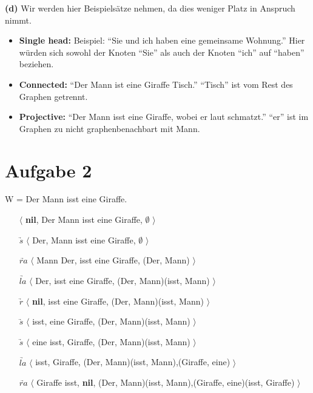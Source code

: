 \documentclass[a4paper,10pt]{article}
\begin{document}
\newpage
\noindent \textbf{(d)} Wir werden hier Beispielsätze nehmen, da dies weniger Platz in Anspruch nimmt.
\begin{itemize}
 \item \textbf{Single head:} Beispiel: ``Sie und ich haben eine gemeinsame Wohnung.'' Hier würden sich sowohl der Knoten ``Sie'' als auch der Knoten ``ich'' auf ``haben''
 beziehen.
 \item \textbf{Connected:} ``Der Mann ist eine Giraffe Tisch.'' ``Tisch'' ist vom Rest des Graphen getrennt.
 \item \textbf{Projective:} ``Der Mann isst eine Giraffe, wobei er laut schmatzt.'' ``er'' ist im Graphen zu nicht graphenbenachbart mit Mann. 
\end{itemize}

\section*{Aufgabe 2}
W =  Der Mann isst eine Giraffe. 
\begin{itemize}
 \item[]  $\langle$ \textbf{nil}, Der Mann isst eine Giraffe, $\emptyset$ $\rangle$
 \item[$\underrightarrow{s}$] $\langle$ Der, Mann isst eine Giraffe, $\emptyset$ $\rangle$
 \item[$\underrightarrow{ra}$] $\langle$ Mann Der, isst eine Giraffe, {(Der, Mann)} $\rangle$
 \item[$\underrightarrow{la}$] $\langle$ Der, isst eine Giraffe, {(Der, Mann)(isst, Mann)} $\rangle$
 \item[$\underrightarrow{r}$] $\langle$ \textbf{nil}, isst eine Giraffe, {(Der, Mann)(isst, Mann)} $\rangle$
 \item[$\underrightarrow{s}$] $\langle$ isst, eine Giraffe, {(Der, Mann)(isst, Mann)} $\rangle$
 \item[$\underrightarrow{s}$] $\langle$ eine isst, Giraffe, {(Der, Mann)(isst, Mann)} $\rangle$
 \item[$\underrightarrow{la}$] $\langle$ isst, Giraffe, {(Der, Mann)(isst, Mann),(Giraffe, eine)} $\rangle$
 \item[$\underrightarrow{ra}$] $\langle$ Giraffe isst, \textbf{nil}, {(Der, Mann)(isst, Mann),(Giraffe, eine)(isst, Giraffe)} $\rangle$
\end{itemize}
\end{document}
